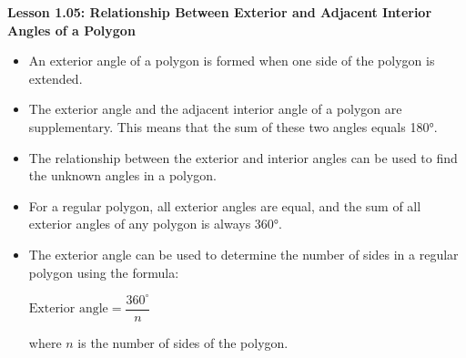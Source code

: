 \begin{center}
\textbf{Lesson 1.05: Relationship Between Exterior and Adjacent Interior Angles of a Polygon}
\end{center}

\vspace*{-1.5ex}

\begin{itemize}
    \item An exterior angle of a polygon is formed when one side of the polygon is extended.
    \item The exterior angle and the adjacent interior angle of a polygon are supplementary. This means that the sum of these two angles equals 180°.
    \item The relationship between the exterior and interior angles can be used to find the unknown angles in a polygon.
    \item For a regular polygon, all exterior angles are equal, and the sum of all exterior angles of any polygon is always 360°.
    \item The exterior angle can be used to determine the number of sides in a regular polygon using the formula:
      
{\centering $
    \text{Exterior angle} = \dfrac{360^\circ}{n}
    $\par}
  
    where \(n\) is the number of sides of the polygon.
\end{itemize}
